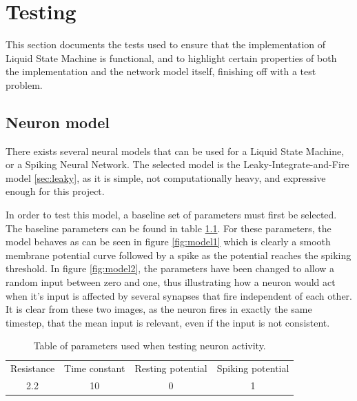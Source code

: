 \chapter{Testing}

This section documents the tests used to ensure that the implementation of Liquid State Machine is functional, and to highlight certain properties of both the implementation and the network model itself, finishing off with a test problem.

\section{Neuron model}

There exists several neural models that can be used for a Liquid State Machine, or a Spiking Neural Network. The selected model is the Leaky-Integrate-and-Fire model \ref{sec:leaky}, as it is simple, not computationally heavy, and expressive enough for this project.

In order to test this model, a baseline set of parameters must first be selected. The baseline parameters can be found in table \ref{tab:neuron}. For these parameters, the model behaves as can be seen in figure \ref{fig:model1} which is clearly a smooth membrane potential curve followed by a spike as the potential reaches the spiking threshold. In figure \ref{fig:model2}, the parameters have been changed to allow a random input between zero and one, thus illustrating how a neuron would act when it's input is affected by several synapses that fire independent of each other. It is clear from these two images, as the neuron fires in exactly the same timestep, that the mean input is relevant, even if the input is not consistent.

\begin{table}[h]
\centering
\begin{tabular}{cccc}
Resistance & Time constant & Resting potential & Spiking potential\\
2.2 & 10 & 0 & 1  
\end{tabular}
\caption{Table of parameters used when testing neuron activity.}
\label{tab:neuron}
\end{table}

